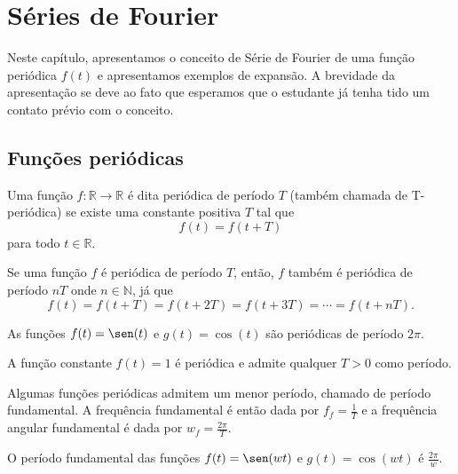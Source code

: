 \chapter{Séries de Fourier} %
Neste capítulo, apresentamos o conceito de Série de Fourier de uma função periódica $f(t)$ e apresentamos exemplos de expansão. A brevidade da apresentação se deve ao fato que esperamos que o estudante já tenha tido um contato prévio com o conceito.
\section{Funções periódicas}
\begin{defn} Uma função $f:\mathbb{R}\to\mathbb{R}$ é dita periódica de período $T$ (também chamada de T-periódica) se existe uma constante positiva $T$ tal que
\begin{equation}f(t)=f(t+T)\end{equation}
para todo $t\in\mathbb{R}.$
\end{defn}
\begin{obs} Se uma função $f$ é periódica de período $T$, então, $f$ também é periódica de período $nT$ onde $n\in\mathbb{N}$, já que
\begin{equation}f(t)=f(t+T)=f(t+2T)=f(t+3T)=\cdots =f(t+nT).\end{equation}
 \end{obs}
 \begin{ex}
  As funções $f(t)=\sen(t)$ e $g(t)=\cos(t)$ são periódicas de período $2\pi$.
 \end{ex}
\begin{ex}
  A função constante $f(t)=1$ é periódica e admite qualquer $T>0$ como período.
 \end{ex}
\begin{defn} Algumas funções periódicas admitem um menor período, chamado de período fundamental. A frequência fundamental é então dada por $f_f=\frac{1}{T}$ e a frequência angular fundamental é dada por $w_f=\frac{2\pi}{T}$.
 \end{defn}
\begin{prop}O período fundamental das funções $f(t)=\sen(wt)$ e $g(t)=\cos(wt)$ é $\frac{2\pi}{w} $.
\end{prop}
